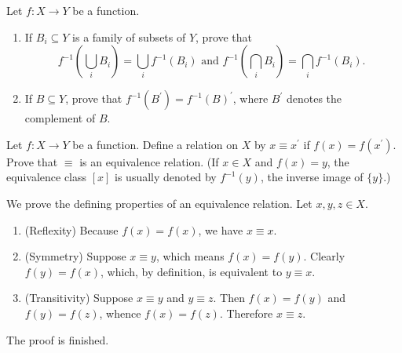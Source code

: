 \begin{questions}
\begin{solution}
    
\end{solution}


\question
    Let \(f: X \rightarrow Y\) be a function.
    \begin{enumerate}[label=(\alph*)]
        \item If \(B_i \subseteq Y\) is a family of subsets of \(Y\), prove that
\[
f^{-1}\left(\bigcup_i B_i\right)=\bigcup_i f^{-1}\left(B_i\right) \text { and } f^{-1}\left(\bigcap_i B_i\right)=\bigcap_i f^{-1}\left(B_i\right) \text {. }
\]
        \item If \(B \subseteq Y\), prove that \(f^{-1}\left(B^{\prime}\right)=f^{-1}(B)^{\prime}\), where \(B^{\prime}\) denotes the complement of \(B\).
    \end{enumerate}



\begin{solution}
    
\end{solution}


\question
    Let \(f: X \rightarrow Y\) be a function. Define a relation on \(X\) by \(x \equiv x^{\prime}\) if \(f(x)=f\left(x^{\prime}\right)\). Prove that \(\equiv\) is an equivalence relation. (If \(x \in X\) and \(f(x)=y\), the equivalence class \([x]\) is usually denoted by \(f^{-1}(y)\), the inverse image of \(\{y\}\).)

\begin{theproof} We prove the defining properties of an equivalence relation. Let \(x,y,z\in X\).
\begin{enumerate}[label=(\roman*)]
    \item (Reflexity) Because   \(f(x) = f(x)\), we have  \(x\equiv x\).
    \item (Symmetry) Suppose \(x\equiv y\), which means \(f(x) = f(y)\). Clearly \(f(y) = f(x)\), which, by definition, is equivalent to  \(y\equiv x\).
    \item (Transitivity) Suppose \(x\equiv y\) and \(y\equiv z\). Then \(f(x) = f(y)\) and \(f(y) = f(z)\), whence \(f(x) = f(z)\). Therefore \(x\equiv z\).
\end{enumerate}
    The proof is finished.
\end{theproof}
\end{questions}
